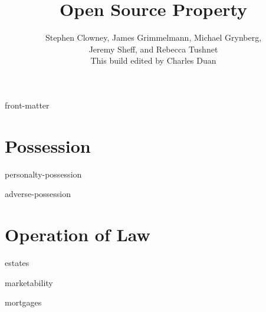 \documentclass[12pt]{book}
\title{Open Source Property}
\author{Stephen Clowney, James Grimmelmann, Michael Grynberg,\\
Jeremy Sheff, and Rebecca Tushnet \\[12pt]
This build edited by Charles Duan}
\begin{document}
\sloppy
\raggedbottom
\frenchspacing
{}                                                
\parskip=0pt                                                  


\frontmatter

\maketitle

\tableofcontents

\module front-matter

\mainmatter

\part{Possession}

\module personalty-possession

\module adverse-possession



\part{Operation of Law}

\module estates

\module marketability

\module mortgages
\end{document}
